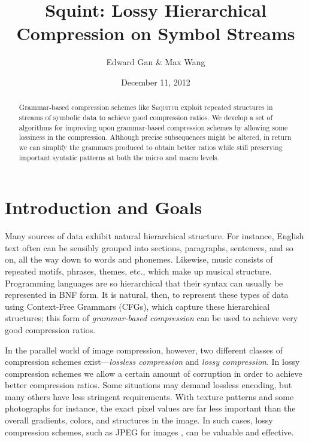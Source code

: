 \documentclass[11pt]{article}
\newcommand{\Sequitur}{\textsc{Sequitur}\xspace}
\begin{document}


\title{%
  \vspace{-.2in}%
  Squint: Lossy Hierarchical Compression on Symbol Streams%
  \vspace{-.1in}%
}
\author{Edward Gan \& Max Wang}
\date{%
  \vspace{-.1in}%
  December 11, 2012%
}

\maketitle

\begin{abstract}

Grammar-based compression schemes like \Sequitur exploit repeated structures in
streams of symbolic data to achieve good compression ratios.  We develop a set
of algorithms for improving upon grammar-based compression schemes by allowing
some lossiness in the compression.  Although precise subsequences might be
altered, in return we can simplify the grammars produced to obtain better
ratios while still preserving important syntatic patterns at both the micro and
macro levels.

\end{abstract}

\setcounter{tocdepth}{2}
\tableofcontents

\section{Introduction and Goals}

Many sources of data exhibit natural hierarchical structure.  For instance,
English text often can be sensibly grouped into sections, paragraphs,
sentences, and so on, all the way down to words and phonemes.  Likewise, music
consists of repeated motifs, phrases, themes, etc., which make up musical
structure.  Programming languages are so hierarchical that their syntax can
usually be represented in BNF form.  It is natural, then, to represent these
types of data using Context-Free Grammars (CFGs), which capture these
hierarchical structures; this form of \emph{grammar-based compression} can be
used to achieve very good compression ratios.

In the parallel world of image compression, however, two different classes of
compression schemes exist---\emph{lossless compression} and \emph{lossy
compression}.  In lossy compression schemes we allow a certain amount of
corruption in order to achieve better compression ratios.  Some situations may
demand lossless encoding, but many others have less stringent requirements.
With texture patterns and some photographs for instance, the exact pixel values
are far less important than the overall gradients, colors, and structures in
the image.  In such cases, lossy compression schemes, such as JPEG for images
\cite{jpeg}, can be valuable and effective.
\end{document}
